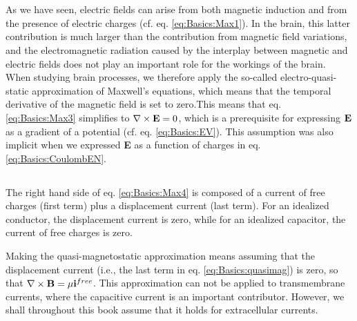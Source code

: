 \section{}
\subsection{}
\label{sec:Basics:Quasielectrostatic} 
As we have seen, electric fields can arise from both magnetic induction and from the presence of electric charges (cf. eq. \ref{eq:Basics:Max1}). In the brain, this latter contribution is much larger than the contribution from magnetic field variations, and the electromagnetic radiation caused by the interplay between magnetic and electric fields does not play an important role for the workings of the brain. When studying brain processes, we therefore apply the so-called electro-quasi-static approximation of Maxwell's equations, which means that the temporal derivative of the magnetic field is set to zero.This means that eq. \ref{eq:Basics:Max3} simplifies to $\nabla \times {\bf E} = 0$, which is a prerequisite for expressing ${\bf E}$ as a gradient of a potential (cf. eq. \ref{eq:Basics:EV}). This assumption was also implicit when we expressed {\bf E} as a function of charges in eq. \ref{eq:Basics:CoulombEN}. 


\subsection{}
\label{sec:Basics:Quasimagnetostatic} 
The right hand side of eq. \ref{eq:Basics:Max4} is composed of a current of free charges (first term) plus a displacement current (last term).  For an idealized conductor, the displacement current is zero, while for an idealized capacitor, the current of free charges is zero. 

Making the quasi-magnetostatic approximation means assuming that the displacement current (i.e., the last term in eq. \ref{eq:Basics:quasimag}) is zero, so that $\nabla \times {\bf B}  =  \mu{\bf i}^{free}$. This approximation can not be applied to transmembrane currents, where the capacitive current is an important contributor. However, we shall throughout this book assume that it holds for extracellular currents. 

